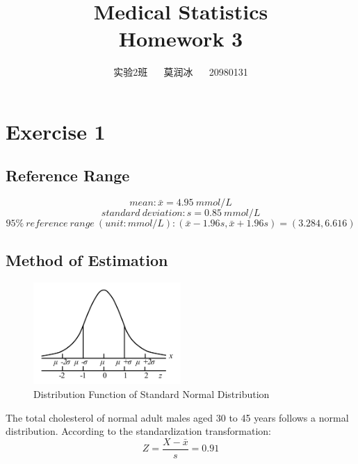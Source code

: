 \documentclass[11pt,a4paper,onside,UTF8]{article}
\title{\blue Medical Statistics \\
\blueb Homework 3}
\author{实验2班 ~~ 莫润冰 ~~ 20980131}
\date{}
\begin{document}
\maketitle

\renewcommand{\thefootnote}{\fnsymbol{footnote}}

\section{Exercise 1} 
\subsection{Reference Range}
\begin{equation}
    mean: \bar{x} = 4.95 \ mmol/L
\end{equation}
\begin{equation}
	standard \ deviation: s = 0.85 \ mmol/L
\end{equation}
\begin{equation}
	95\% \ reference \ range \ (unit:mmol/L): (\bar{x}-1.96s,\bar{x}+1.96s) = (3.284,6.616)
\end{equation}

\subsection{Method of Estimation}
\begin{figure}[H]
	\centering
    \includegraphics[width=0.5\textwidth]{fig//normal_dist.jpg}
	\caption{Distribution Function of Standard Normal Distribution}
\end{figure}

The total cholesterol of normal adult males aged 30 to 45 years follows a normal distribution. According to the standardization transformation:
\begin{equation}
	Z=\frac{X-\bar{x}}{s} = 0.91
\end{equation}
\end{document}
